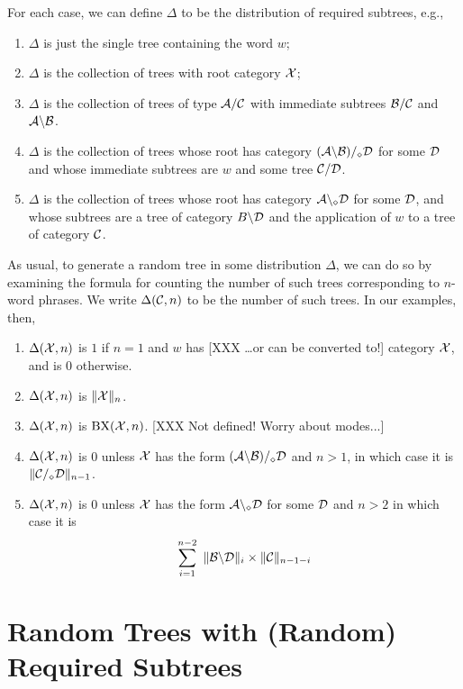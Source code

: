 \documentclass[10pt]{article}
\begin{document}
For each case, we can define $\Delta$ to be the distribution of required subtrees, e.g.,

\begin{enumerate}
    \item \(\Delta\) is just the single tree containing the word $w$;
    \item \(\Delta\) is the collection of trees with root category ${\cal X}$;
    \item \(\Delta\) is the collection of trees of type ${\cal A}/{\cal C}$ with immediate subtrees ${\cal B}/{\cal C}$ and \({\cal A}\backslash{\cal B}\).
    \item \(\Delta\) is the collection of trees whose root has category \(({\cal A}\backslash {\cal B})/_\diamond{\cal D}\) for some ${\cal D}$ and whose immediate subtrees are $w$ and some tree \({\cal C}/{\cal D}\).
    \item \(\Delta\) is the collection of trees whose root has category \({\cal A}\backslash_{\diamond}{\cal D}\) for some ${\cal D}$, and whose subtrees are a tree of category $B\backslash{\cal D}$ and the application of $w$ to a tree of category ${\cal C}$.
\end{enumerate}

As usual, to generate a random tree in some distribution $\Delta$, we can do so by examining the formula for counting the number of such trees corresponding to $n$-word phrases.  We write $\Delta({\cal C},n)$ to be the number of such trees.  In our examples, then,

\begin{enumerate}
    \item \(\Delta({\cal X},n)\) is $1$ if $n = 1$ and $w$ has [XXX \ldots or can be converted to!] category ${\cal X}$, and is $0$ otherwise.
    \item \(\Delta({\cal X},n)\) is $\|{\cal X}\|_n$.
    \item \(\Delta({\cal X},n)\) is $\mbox{BX}({\cal X},n)$. [XXX Not defined! Worry about modes...]
    \item \(\Delta({\cal X},n)\) is $0$ unless ${\cal X}$ has the form \(({\cal A}\backslash {\cal B})/_\diamond{\cal D}\) and \(n>1\), in which case it is \(\|{\cal C}/_\diamond{\cal D}\|_{n-1}\).
    \item \(\Delta({\cal X},n)\) is $0$ unless ${\cal X}$ has the form \({\cal A}\backslash_{\diamond}{\cal D}\) for some ${\cal D}$ and $n>2$ in which case it is
    \[
       \displaystyle \sum_{i=1}^{n-2}\ \|\B\backslash\D\|_i\times\|\C\|_{n-1-i}
    \]
\end{enumerate}

\section{Random Trees with (Random) Required Subtrees}
\end{document}
